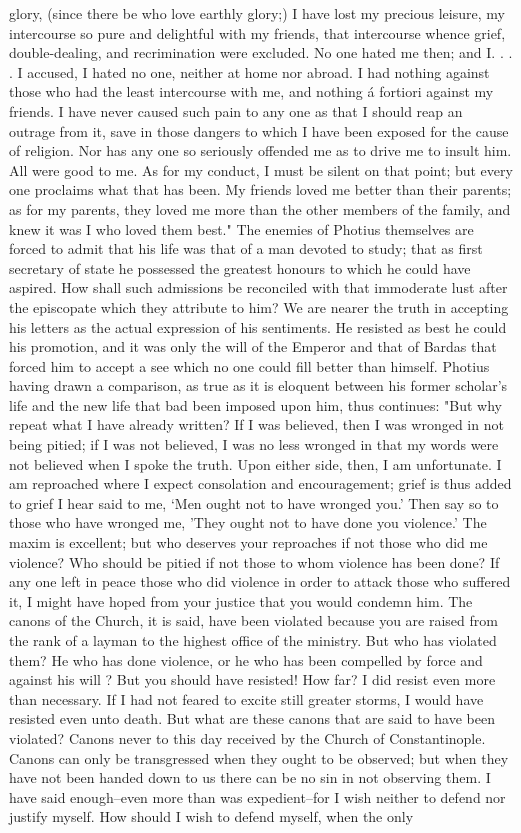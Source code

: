 glory, (since there be who love earthly glory;) I have lost my precious leisure, my intercourse so pure and delightful with my friends, that intercourse whence grief, double-dealing, and recrimination were excluded. No one hated me then; and I. . . . I accused, I hated no one, neither at home nor abroad. I had nothing against those who had the least intercourse with me, and nothing á fortiori against my friends. I have never caused such pain to any one as that I should reap an outrage from it, save in those dangers to which I have been exposed for the cause of religion. Nor has any one so seriously offended me as to drive me to insult him. All were good to me. As for my conduct, I must be silent on that point; but every one proclaims what that has been. My friends loved me better than their parents; as for my parents, they loved me more than the other members of the family, and knew it was I who loved them best." The enemies of Photius themselves are forced to admit that his life was that of a man devoted to study; that as first secretary of state he possessed the greatest honours to which he could have aspired. How shall such admissions be reconciled with that immoderate lust after the episcopate which they attribute to him? We are nearer the truth in accepting his letters as the actual expression of his sentiments. He resisted as best he could his promotion, and it was only the will of the Emperor and that of Bardas that forced him to accept a see which no one could fill better than himself. Photius having drawn a comparison, as true as it is eloquent between his former scholar's life and the new life that bad been imposed upon him, thus continues: "But why repeat what I have already written? If I was believed, then I was wronged in not being pitied; if I was not believed, I was no less wronged in that my words were not believed when I spoke the truth. Upon either side, then, I am unfortunate. I am reproached where I expect consolation and encouragement; grief is thus added to grief I hear said to me, ‘Men ought not to have wronged you.' Then say so to those who have wronged me, 'They ought not to have done you violence.' The maxim is excellent; but who deserves your reproaches if not those who did me violence? Who should be pitied if not those to whom violence has been done? If any one left in peace those who did violence in order to attack those who suffered it, I might have hoped from your justice that you would condemn him. The canons of the Church, it is said, have been violated because you are raised from the rank of a layman to the highest office of the ministry. But who has violated them? He who has done violence, or he who has been compelled by force and against his will ? But you should have resisted! How far? I did resist even more than necessary. If I had not feared to excite still greater storms, I would have resisted even unto death. But what are these canons that are said to have been violated? Canons never to this day received by the Church of Constantinople. Canons can only be transgressed when they ought to be observed; but when they have not been handed down to us there can be no sin in not observing them. I have said enough--even more than was expedient--for I wish neither to defend nor justify myself. How should I wish to defend myself, when the only 